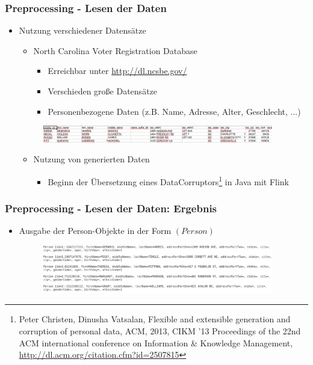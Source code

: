 \documentclass{beamer}
\begin{document}
    \begin{frame}
    		\frametitle{Preprocessing - Lesen der Daten}
    		\begin{itemize}
    			\item Nutzung verschiedener Datensätze
    			\begin{itemize}
    				\item North Carolina Voter Registration Database
    				\begin{itemize}
    					\item Erreichbar unter \url{http://dl.ncsbe.gov/}
    					\item Verschieden große Datensätze
    					\item Personenbezogene Daten (z.B. Name, Adresse, Alter, Geschlecht, ...)
    				\end{itemize}
			\end{itemize}
			\begin{figure}
    				\includegraphics[width=0.95\textwidth]{graphics/voter_dataset.png}
    			\end{figure}
    			\begin{itemize}
    				\item Nutzung von generierten Daten
    				\begin{itemize}
    					\item Beginn der Übersetzung eines DataCorruptors\footnote{Peter Christen, Dinusha Vatsalan, Flexible and extensible generation and corruption of personal data, ACM, 2013, CIKM '13 Proceedings of the 22nd ACM international conference on Information \& Knowledge Management,  \url{http://dl.acm.org/citation.cfm?id=2507815}} in Java mit Flink 
    				\end{itemize}	
    			\end{itemize} 
    		\end{itemize}
    \end{frame}
    
    \begin{frame}
    		\frametitle{Preprocessing - Lesen der Daten: Ergebnis}
    		\begin{itemize}
    				\item Ausgabe der Person-Objekte in der Form $(Person)$
    				\begin{figure}[H]
    					\includegraphics[width=0.95\textwidth]{graphics/persons.png}
    				\end{figure}
    		\end{itemize}
    \end{frame}
    
\end{document}
